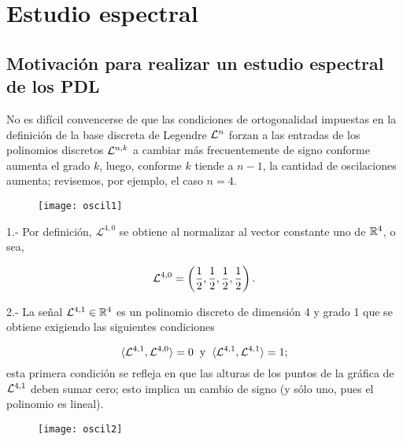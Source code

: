 \chapter{Estudio espectral}
\label{chap: estudio espectral}


\section{Motivación para realizar un estudio espectral de los PDL}
No es difícil convencerse de que las condiciones de ortogonalidad
impuestas en la definición de la base discreta de Legendre
$\mathcal{L}^{n}$
forzan a las entradas de los polinomios discretos $\mathcal{L}^{n,k}$
a cambiar más frecuentemente de signo conforme aumenta
el grado $k$, luego, conforme $k$ tiende a $n-1$,
la cantidad de oscilaciones aumenta; revisemos, 
por ejemplo, el caso $n=4$.



\begin{minipage}{0.5\textwidth}
\begin{figure}[H]
\texttt{[image: oscil1]}
\end{figure}
\end{minipage} \hfill
\begin{minipage}{0.45\textwidth}
1.- Por definición,
$\mathcal{L}^{4,0}$ se obtiene al normalizar 
al vector constante uno de $\mathbb{R}^{4}$, o sea, 

\[
\mathcal{L}^{4,0} = \left(
\frac{1}{2}, \frac{1}{2}, \frac{1}{2}, \frac{1}{2}
\right).
\]
\end{minipage} 


\begin{minipage}{0.5\textwidth}
2.- La señal $\mathcal{L}^{4,1} \in \mathbb{R}^{4}$ es un polinomio discreto de
dimensión 4 y grado 1 que se obtiene exigiendo las
siguientes condiciones

\[
\langle \mathcal{L}^{4,1} , \mathcal{L}^{4,0} \rangle=0
\hspace{0.2cm} \text{y} \hspace{0.2cm}
\langle \mathcal{L}^{4,1} , \mathcal{L}^{4,1} \rangle=1;
\]
esta primera condición se refleja en que 
las alturas de los puntos de la gráfica de 
$\mathcal{L}^{4,1}$ deben sumar cero;
esto implica un cambio de signo (y sólo uno,
pues el polinomio es lineal).

\end{minipage} \hfill
\begin{minipage}{0.45\textwidth}
\begin{figure}[H]
\texttt{[image: oscil2]}
\end{figure}
\end{minipage}

